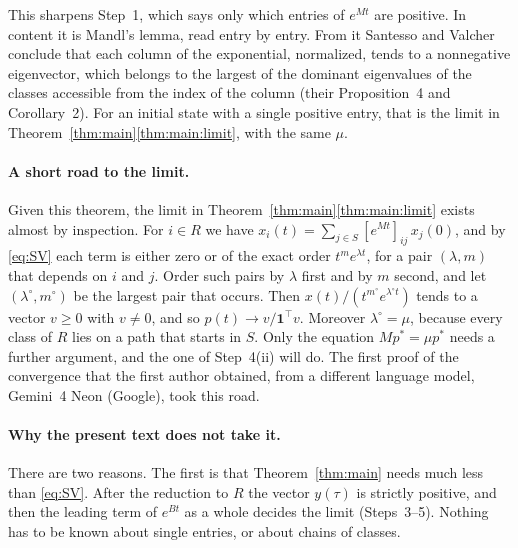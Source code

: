 \documentclass[11pt]{article}
\theoremstyle{definition}
\theoremstyle{remark}
\newcommand{\one}{\mathbf{1}}
\newcommand{\T}{\top}
\begin{document}
This sharpens Step~1, which says only which entries of $e^{Mt}$ are positive. In content it is
Mandl's lemma, read entry by entry. From it Santesso and Valcher conclude that each column of
the exponential, normalized, tends to a nonnegative eigenvector, which belongs to the largest of
the dominant eigenvalues of the classes accessible from the index of the column (their
Proposition~4 and Corollary~2). For an initial state with a single positive entry, that is the
limit in Theorem~\ref{thm:main}\ref{thm:main:limit}, with the same $\mu$.

\paragraph{A short road to the limit.}
Given this theorem, the limit in Theorem~\ref{thm:main}\ref{thm:main:limit} exists almost by
inspection. For $i \in R$ we have $x_i(t) = \sum_{j \in S} [e^{Mt}]_{ij}\, x_j(0)$, and by
\eqref{eq:SV} each term is either zero or of the exact order $t^{m} e^{\lambda t}$, for a pair
$(\lambda, m)$ that depends on $i$ and $j$. Order such pairs by $\lambda$ first and by $m$
second, and let $(\lambda^\circ, m^\circ)$ be the largest pair that occurs. Then
$x(t)/(t^{m^\circ} e^{\lambda^\circ t})$ tends to a vector $v \ge 0$ with $v \ne 0$, and so
$p(t) \to v/\one^\T v$. Moreover $\lambda^\circ = \mu$, because every class of $R$ lies on a
path that starts in $S$. Only the equation $M p^* = \mu p^*$ needs a further argument, and the
one of Step~4(ii) will do. The first proof of the convergence that the first author obtained,
from a different language model, Gemini~4 Neon (Google), took this road.

\paragraph{Why the present text does not take it.}
There are two reasons. The first is that Theorem~\ref{thm:main} needs much less than
\eqref{eq:SV}. After the reduction to $R$ the vector $y(\tau)$ is strictly positive, and then
the leading term of $e^{Bt}$ as a whole decides the limit (Steps~3--5). Nothing has to be known
about single entries, or about chains of classes.
\end{document}
